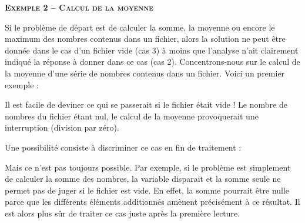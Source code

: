 {\sffamily\bfseries\scshape
Exemple 2 – Calcul de la moyenne}

Si le problème de départ est de calculer la somme, la moyenne ou encore
le maximum des nombres contenus dans un fichier, alors la solution ne
peut être donnée dans le cas d'un fichier vide (cas 3)
à moins que l'analyse n'ait
clairement indiqué la réponse à donner dans ce cas (cas 2).
Concentrons-nous sur le calcul de la moyenne d’une série de nombres
contenus dans un fichier. Voici un premier exemple
:



Il est facile de deviner ce qui se passerait si le fichier était vide !
Le nombre de nombres du fichier étant nul, le calcul de la moyenne
provoquerait une interruption (division par zéro).


Une possibilité consiste à discriminer ce cas en fin de traitement :


Mais ce n'est pas toujours possible. Par exemple, si le
problème est simplement de calculer la somme des nombres, la variable
 disparait et la somme seule ne permet pas de
juger si le fichier est vide. En effet, la somme pourrait être nulle
parce que les différents éléments additionnés amènent précisément à ce
résultat. Il est alors plus sûr de traiter ce cas juste après la
première lecture.

